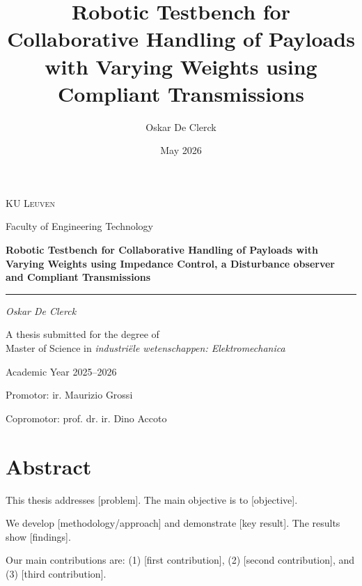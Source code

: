 \documentclass[11pt,a4paper,twoside,openright]{book}
\title{Robotic Testbench for Collaborative Handling of Payloads with Varying Weights using Compliant Transmissions}
\author{Oskar De Clerck}
\date{May 2026}
\begin{document}
\begin{titlepage}
    \centering
    \vspace*{2cm}
    
    {\Large\scshape KU Leuven\par}
    \vspace{0.5cm}
    {\large Faculty of Engineering Technology\par}
    \vspace{2.5cm}
    
    {\Huge\bfseries Robotic Testbench for Collaborative Handling of Payloads with Varying Weights using Impedance Control, a Disturbance observer and Compliant Transmissions\par}
    \vspace{0.5cm}
    \rule{10cm}{0.4pt}\par
    \vspace{3cm}
    
    {\Large\itshape Oskar De Clerck\par}
    \vfill
    
    {\large A thesis submitted for the degree of\\
    Master of Science in \textit{industriële wetenschappen: Elektromechanica}\par}
    \vfill
    
    {\large Academic Year 2025--2026\par}
    \vspace{0.5cm}
    {\large Promotor: ir. Maurizio Grossi\par}
    {\large Copromotor: prof. dr. ir. Dino Accoto\par}
    
\end{titlepage}

\frontmatter

\chapter*{Abstract}

This thesis addresses [problem]. The main objective is to [objective]. 

We develop [methodology/approach] and demonstrate [key result]. The results show [findings]. 

Our main contributions are: (1) [first contribution], (2) [second contribution], and (3) [third contribution].
\end{document}
